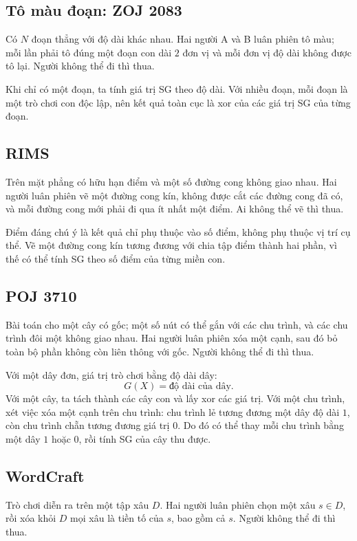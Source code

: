 \documentclass[11pt]{article}
\begin{document}
\subsection{Tô màu đoạn: ZOJ 2083}

Có \(N\) đoạn thẳng với độ dài khác nhau. Hai người A và B luân phiên tô màu;
mỗi lần phải tô đúng một đoạn con dài \(2\) đơn vị và mỗi đơn vị độ dài không
được tô lại. Người không thể đi thì thua.

Khi chỉ có một đoạn, ta tính giá trị SG theo độ dài. Với nhiều đoạn, mỗi đoạn
là một trò chơi con độc lập, nên kết quả toàn cục là xor của các giá trị SG
của từng đoạn.

\subsection{RIMS}

Trên mặt phẳng có hữu hạn điểm và một số đường cong không giao nhau. Hai người
luân phiên vẽ một đường cong kín, không được cắt các đường cong đã có, và mỗi
đường cong mới phải đi qua ít nhất một điểm. Ai không thể vẽ thì thua.

Điểm đáng chú ý là kết quả chỉ phụ thuộc vào số điểm, không phụ thuộc vị trí
cụ thể. Vẽ một đường cong kín tương đương với chia tập điểm thành hai phần,
vì thế có thể tính SG theo số điểm của từng miền con.

\subsection{POJ 3710}

Bài toán cho một cây có gốc; một số nút có thể gắn với các chu trình, và các
chu trình đôi một không giao nhau. Hai người luân phiên xóa một cạnh, sau đó
bỏ toàn bộ phần không còn liên thông với gốc. Người không thể đi thì thua.

Với một dây đơn, giá trị trò chơi bằng độ dài dây:
\[
  G(X)=\text{độ dài của dây}.
\]
Với một cây, ta tách thành các cây con và lấy xor các giá trị. Với một chu
trình, xét việc xóa một cạnh trên chu trình: chu trình lẻ tương đương một dây
độ dài \(1\), còn chu trình chẵn tương đương giá trị \(0\). Do đó có thể thay
mỗi chu trình bằng một dây \(1\) hoặc \(0\), rồi tính SG của cây thu được.

\subsection{WordCraft}

Trò chơi diễn ra trên một tập xâu \(D\). Hai người luân phiên chọn một xâu
\(s\in D\), rồi xóa khỏi \(D\) mọi xâu là tiền tố của \(s\), bao gồm cả
\(s\). Người không thể đi thì thua.
\end{document}
